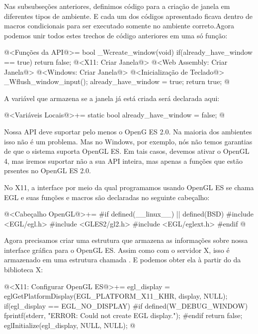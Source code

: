
Nas subsubseções anteriores, definimos código para a criação de janela
em diferentes tipos de ambiente. E cada um dos códigos apresentado
ficava dentro de macros condicionais para ser executado somente no
ambiente correto.Agora podemos unir todos estes trechos de código
anteriores em uma só função:

\iniciocodigo
@<Funções da API@>=
bool _Wcreate_window(void){
  if(already_have_window == true)
    return false;
  @<X11: Criar Janela@>
  @<Web Assembly: Criar Janela@>
  @<Windows: Criar Janela@>
  @<Inicialização de Teclado@>
  _Wflush_window_input();
  already_have_window = true;
  return true;
}
@
\fimcodigo

A variável que armazena se a janela já está criada será declarada
aqui:

\iniciocodigo
@<Variáveis Locais@>+=
static bool already_have_window = false;
@
\fimcodigo


Nossa API deve suportar pelo menos o OpenG ES 2.0. Na maioria dos
ambientes isso não é um problema. Mas no Windows, por exemplo, nós não
temos garantias de que o sistema suporta OpenGL ES. Em tais casos,
devemos ativar o OpenGL 4, mas iremos suportar não a sua API inteira,
mas apenas a funções que estão prsentes no OpenGL ES 2.0.


No X11, a interface por meio da qual programamos usando OpenGL ES se
chama EGL e suas funções e macros são declaradas no seguinte
cabeçalho:

\iniciocodigo
@<Cabeçalho OpenGL@>+=
#if defined(__linux__) || defined(BSD)
#include <EGL/egl.h>
#include <GLES2/gl2.h>
#include <EGL/eglext.h>
#endif
@
\fimcodigo

Agora precisamos criar uma estrutura que armazena as informações sobre
nossa interface gráfica para o OpenGL ES. Assim como com o servidor X,
isso é armazenado em uma estrutura chamada . E
podemos obter ela à partir do  da biblioteca X:

\iniciocodigo
@<X11: Configurar OpenGL ES@>+=
egl_display = eglGetPlatformDisplay(EGL_PLATFORM_X11_KHR, display,
                                    NULL);
if(egl_display == EGL_NO_DISPLAY){
#if defined(W_DEBUG_WINDOW)
  fprintf(stderr, "ERROR: Could not create EGL display.\n");
#endif
  return false;
}
eglInitialize(egl_display, NULL, NULL);
@
\fimcodigo

